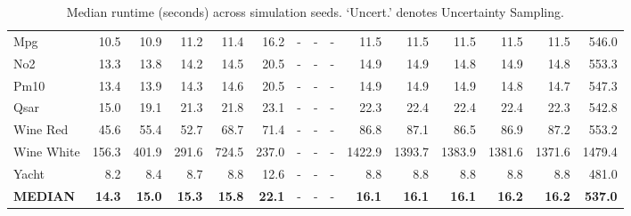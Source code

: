 \begin{table}[htbp]
\begin{tabular}{l rrrrrrrrrrrrrr}
        Mpg & 10.5 & 10.9 & 11.2 & 11.4 & 16.2 & - & - & - & 11.5 & 11.5 & 11.5 & 11.5 & 11.5 & 546.0 \\
        No2 & 13.3 & 13.8 & 14.2 & 14.5 & 20.5 & - & - & - & 14.9 & 14.9 & 14.8 & 14.9 & 14.8 & 553.3 \\
        Pm10 & 13.4 & 13.9 & 14.3 & 14.6 & 20.5 & - & - & - & 14.9 & 14.9 & 14.9 & 14.8 & 14.7 & 547.3 \\
        Qsar & 15.0 & 19.1 & 21.3 & 21.8 & 23.1 & - & - & - & 22.3 & 22.4 & 22.4 & 22.4 & 22.3 & 542.8 \\
        Wine Red & 45.6 & 55.4 & 52.7 & 68.7 & 71.4 & - & - & - & 86.8 & 87.1 & 86.5 & 86.9 & 87.2 & 553.2 \\
        Wine White & 156.3 & 401.9 & 291.6 & 724.5 & 237.0 & - & - & - & 1422.9 & 1393.7 & 1383.9 & 1381.6 & 1371.6 & 1479.4 \\
        Yacht & 8.2 & 8.4 & 8.7 & 8.8 & 12.6 & - & - & - & 8.8 & 8.8 & 8.8 & 8.8 & 8.8 & 481.0 \\
        \textbf{MEDIAN} & \textbf{14.3} & \textbf{15.0} & \textbf{15.3} & \textbf{15.8} & \textbf{22.1} & - & - & - & \textbf{16.1} & \textbf{16.1} & \textbf{16.1} & \textbf{16.2} & \textbf{16.2} & \textbf{537.0} \\
        \bottomrule
    \end{tabular}
    \caption{Median runtime (seconds) across simulation seeds. `Uncert.' denotes Uncertainty Sampling.}
    \label{tab:RuntimeComparison}
\end{table}
